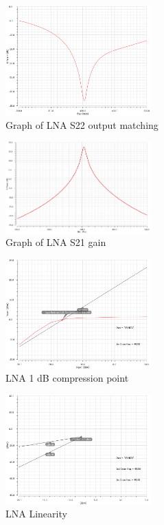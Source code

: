 \begin{figure}[h]
   \centering
    \includegraphics[width=0.5\textwidth]{figures/s22.png}
    \caption{Graph of LNA S22 output matching}
    \label{fig:s22}
\end{figure}

\begin{figure}[h]
   \centering
    \includegraphics[width=0.5\textwidth]{figures/s21.png}
    \caption{Graph of LNA S21 gain}
    \label{fig:s21}
\end{figure}

\begin{figure}[h]
   \centering
    \includegraphics[width=0.5\textwidth]{figures/lna1db.png}
    \caption{LNA 1 dB compression point}
    \label{fig:lna1db}
\end{figure}

\begin{figure}[h]
   \centering
    \includegraphics[width=0.5\textwidth]{figures/lnaiip3.png}
    \caption{LNA Linearity}
    \label{fig:lnaiip3}
\end{figure}

